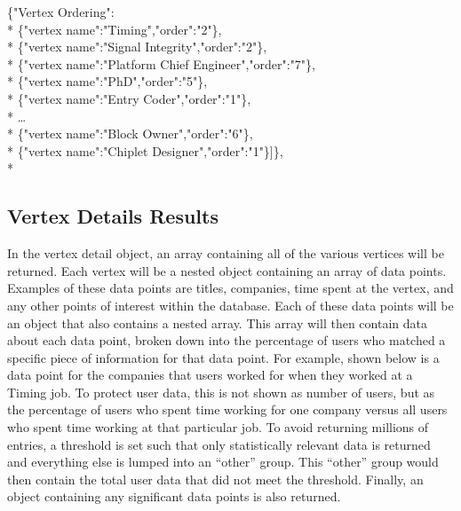 \begin{tt}
\begin{footnotesize}
\noindent \{"Vertex Ordering":\\*
	\indent\{"vertex name":"Timing","order":"2"\},\\*
	\indent\{"vertex name":"Signal Integrity","order":"2"\},\\*
	\indent\{"vertex name":"Platform Chief Engineer","order":"7"\},\\*
	\indent\{"vertex name":"PhD","order":"5"\},\\*
	\indent\{"vertex name":"Entry Coder","order":"1"\},\\*
	\indent\ldots\\*
	\indent\{"vertex name":"Block Owner","order":"6"\},\\*
	\indent\{"vertex name":"Chiplet Designer","order":"1"\}]\},\\*
\end{footnotesize}
\end{tt}

\subsection{Vertex Details Results}
In the vertex detail object, an array containing all of the various vertices
will be returned.  Each vertex will be a nested object containing an array of data
points.  Examples of these data points are titles, companies, time spent at the
vertex, and any other points of interest within the database.  Each of these
data points will be an object that also contains a nested array.  This array
will then contain data about each data point, broken down into the percentage of
users who matched a specific piece of information for that data point.  For
example, shown below is a data point for the companies that users worked for
when they worked at a Timing job.  To protect user data, this is not shown as
number of users, but as the percentage of users who spent time working for one
company versus all users who spent time working at that particular job.  To
avoid returning millions of entries, a threshold is set such that only
statistically relevant data is returned and everything else is lumped into an
``other'' group.  This ``other'' group would then contain the total user data
that did not meet the threshold.  Finally, an object containing any significant
data points is also returned.

